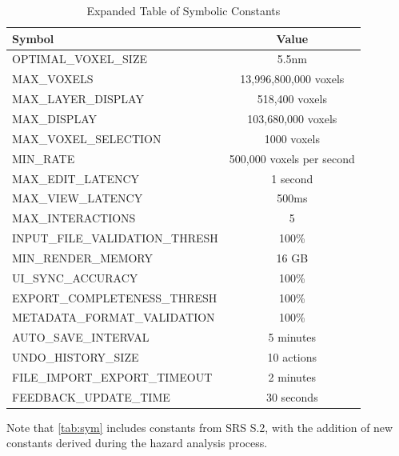 \documentclass{article}
\begin{document}
\begin{table}[H]
    \centering
    \renewcommand{\arraystretch}{1.2}
    \caption{Expanded Table of Symbolic Constants}
    \label{tab:sym}
    \begin{tabular}{|l|c|}
        \hline 
        \textbf{Symbol} & \textbf{Value} \\
        \hline
        OPTIMAL\_VOXEL\_SIZE & 5.5nm \\
        MAX\_VOXELS & 13,996,800,000 voxels \\
        MAX\_LAYER\_DISPLAY & 518,400 voxels \\
        MAX\_DISPLAY & 103,680,000 voxels \\
        MAX\_VOXEL\_SELECTION & 1000 voxels \\
        MIN\_RATE & 500,000 voxels per second \\
        MAX\_EDIT\_LATENCY & 1 second \\
        MAX\_VIEW\_LATENCY & 500ms \\
        MAX\_INTERACTIONS & 5\\
        INPUT\_FILE\_VALIDATION\_THRESH & 100\% \\
        MIN\_RENDER\_MEMORY & 16 GB \\
        UI\_SYNC\_ACCURACY & 100\% \\
        EXPORT\_COMPLETENESS\_THRESH & 100\% \\
        METADATA\_FORMAT\_VALIDATION & 100\% \\
        AUTO\_SAVE\_INTERVAL & 5 minutes \\
        UNDO\_HISTORY\_SIZE & 10 actions \\
        FILE\_IMPORT\_EXPORT\_TIMEOUT &  2 minutes \\
        FEEDBACK\_UPDATE\_TIME & 30 seconds \\
        \hline
    \end{tabular}
\end{table}

Note that \autoref{tab:sym} includes constants from SRS S.2, with the addition of new constants derived during the hazard analysis process.
\end{document}

